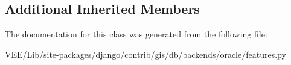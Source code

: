 \subsection*{Additional Inherited Members}


The documentation for this class was generated from the following file\+:\begin{DoxyCompactItemize}
\item 
V\+E\+E/\+Lib/site-\/packages/django/contrib/gis/db/backends/oracle/features.\+py\end{DoxyCompactItemize}

